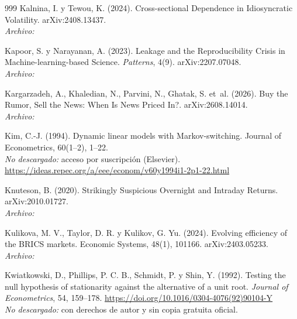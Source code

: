 \begin{thebibliography}{999}
Kalnina, I. y Tewou, K. (2024). Cross-sectional Dependence in Idiosyncratic Volatility. arXiv:2408.13437.
\\\textit{Archivo:} 

Kapoor, S. y Narayanan, A. (2023). Leakage and the Reproducibility Crisis in Machine-learning-based Science. \emph{Patterns}, 4(9). arXiv:2207.07048.
\\\textit{Archivo:} 

Kargarzadeh, A., Khaledian, N., Parvini, N., Ghatak, S. et~al. (2026). Buy the Rumor, Sell the News: When Is News Priced In?. arXiv:2608.14014.
\\\textit{Archivo:} 

Kim, C.-J. (1994). Dynamic linear models with Markov-switching. Journal of Econometrics, 60(1–2), 1–22.
\\\textit{No descargado:} acceso por suscripción (Elsevier). \url{https://ideas.repec.org/a/eee/econom/v60y1994i1-2p1-22.html}

Knuteson, B. (2020). Strikingly Suspicious Overnight and Intraday Returns. arXiv:2010.01727.
\\\textit{Archivo:} 

Kulikova, M. V., Taylor, D. R. y Kulikov, G. Yu. (2024). Evolving efficiency of the BRICS markets. Economic Systems, 48(1), 101166. arXiv:2403.05233.
\\\textit{Archivo:} 

Kwiatkowski, D., Phillips, P. C. B., Schmidt, P. y Shin, Y. (1992). Testing the null hypothesis of stationarity against the alternative of a unit root. \emph{Journal of Econometrics}, 54, 159--178. \url{https://doi.org/10.1016/0304-4076(92)90104-Y}
\\\textit{No descargado:} con derechos de autor y sin copia gratuita oficial.


\end{thebibliography}
